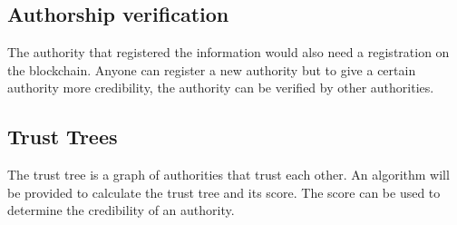 \documentclass[../ockr-specification.tex]{subfiles}
\begin{document}
\subsection{Authorship verification}

The authority that registered the information would also need a registration on the blockchain. Anyone can register a new authority but to give a certain authority more credibility, the authority can be verified by other authorities.

\subsection{Trust Trees}

The trust tree is a graph of authorities that trust each other. An algorithm will be provided to calculate the trust tree and its score. The score can be used to determine the credibility of an authority.
\end{document}
